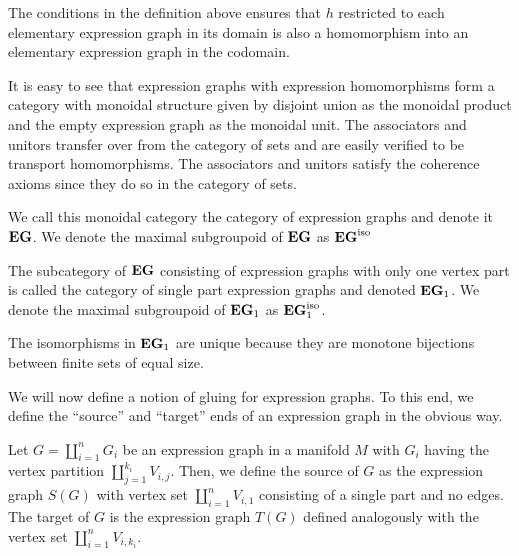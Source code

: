 \documentclass[./Thick_TQFTs_and_Quantum_Information.tex]{subfiles}
\begin{document}
\begin{rmk}
The conditions in the definition above ensures that $h$ restricted to each
elementary expression graph in its domain is also a homomorphism into an
elementary expression graph in the codomain.
\end{rmk}

It is easy to see that expression graphs with expression homomorphisms form a
category with monoidal structure given by disjoint union as the monoidal product
and the empty expression graph as the monoidal unit. The associators and unitors
transfer over from the category of sets and are easily verified to be transport
homomorphisms. The associators and unitors satisfy the coherence axioms since
they do so in the category of sets. 

\begin{defn}
We call this monoidal category the category of expression graphs and denote it
$\textbf{EG}$. We denote the maximal subgroupoid of $\textbf{EG}$ as $\textbf{EG}^{\text{iso}}$
\end{defn}

\begin{defn}
The subcategory of $\textbf{EG}$ consisting of expression graphs with only one vertex
part is called the category of single part expression graphs and denoted
$\textbf{EG}_1$. We denote the maximal subgroupoid of $\textbf{EG}_1$ as $\textbf{EG}_1^{\text{iso}}$.
\end{defn}

\begin{rmk}
The isomorphisms in $\textbf{EG}_1$ are unique because they are monotone bijections
between finite sets of equal size.
\end{rmk}

We will now define a notion of gluing for expression graphs. To this end, we
define the ``source'' and ``target'' ends of an expression graph in the obvious
way.

\begin{defn}
Let $G = \coprod_{i = 1}^{n} G_i$ be an expression graph in a manifold $M$ with
$G_i$ having the vertex partition $\coprod_{j = 1}^{k_i} V_{i, j}$. Then, we
define the source of $G$ as the expression graph $S(G)$ with vertex set
$\coprod_{i = 1}^{n} V_{i, 1}$ consisting of a single part and no edges.
The target of $G$ is the expression graph $T(G)$ defined analogously with the
vertex set $\coprod_{i = 1}^{n} V_{i, k_i}$.
\end{defn}
\end{document}
